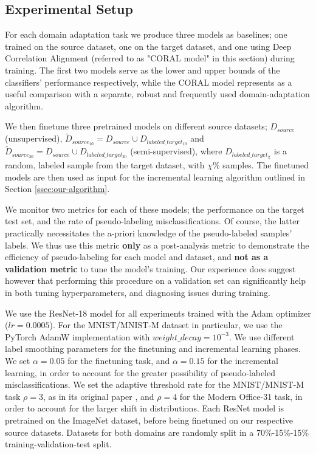 \documentclass{article}
\begin{document}
	
	\subsection{Experimental Setup}
	
	For each domain adaptation task we produce three models as baselines; one trained on the source dataset, one on the target dataset, and one using Deep Correlation Alignment \parencite{coral} (referred to as "CORAL model" in this section) during training. The first two models serve as the lower and upper bounds of the classifiers' performance respectively, while the CORAL model represents as a useful comparison with a separate, robust and frequently used domain-adaptation algorithm.
	
	We then finetune three pretrained models on different source datasets; $D_{source}$ (unsupervised), $\tilde{D}_{source_{10}} = D_{source} \cup D_{labeled\_target_{10}}$ and $\tilde{D}_{source_{20}} = D_{source} \cup D_{labeled\_target_{20}}$ (semi-supervised), where $D_{labeled\_target_{\chi}}$ is a random, labeled sample from the target dataset, with $\chi\%$ samples. The finetuned models are then used as input for the incremental learning algorithm outlined in Section \ref{ssec:our-algorithm}.
	
	We monitor two metrics for each of these models; the performance on the target test set, and the rate of pseudo-labeling misclassifications. Of course, the latter practically necessitates the a-priori knowledge of the pseudo-labeled samples' labels. We thus use this metric \textbf{only} as a post-analysis metric to demonstrate the efficiency of pseudo-labeling for each model and dataset, and \textbf{not as a validation metric} to tune the model's training. Our experience does suggest however that performing this procedure on a validation set can significantly help in both tuning hyperparameters, and diagnosing issues during training.
	
	We use the ResNet-18 model \parencite{resnet} for all experiments trained with the Adam optimizer ($lr=0.0005$). For the MNIST/MNIST-M dataset in particular, we use the PyTorch AdamW implementation with $weight\_decay = 10^{-3}$. We use different label smoothing parameters for the finetuning and incremental learning phases. We set $\alpha = 0.05$ for the finetuning task, and $\alpha = 0.15$ for the incremental learning, in order to account for the greater possibility of pseudo-labeled misclassifications. We set the adaptive threshold rate for the MNIST/MNIST-M task $\rho = 3$, as in its original paper \cite{ican}, and $\rho=4$ for the Modern Office-31 task, in order to account for the larger shift in distributions. Each ResNet model is pretrained on the ImageNet \cite{imagenet} dataset, before being finetuned on our respective source datasets. Datasets for both domains are randomly split in a 70\%-15\%-15\% training-validation-test split.
	
\end{document}
